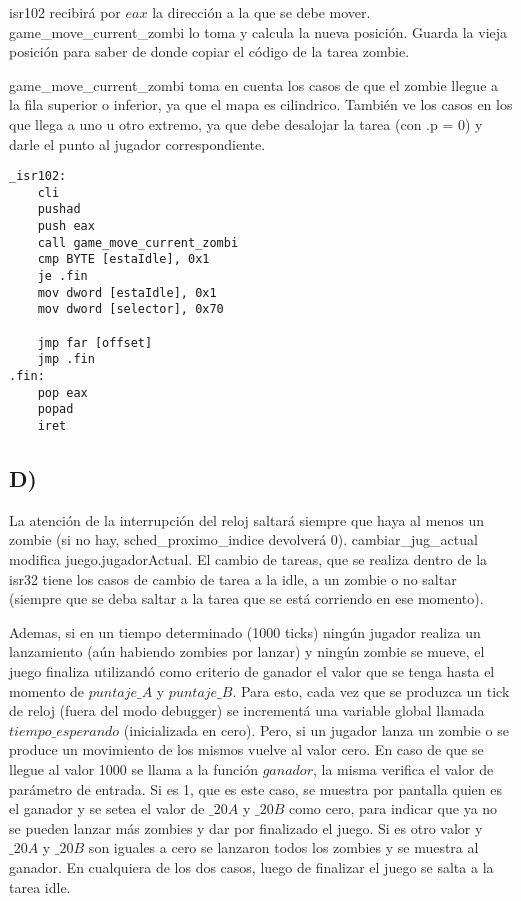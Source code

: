 isr102 recibir\'a por $eax$ la direcci\'on a la que se debe mover. game\_move\_current\_zombi lo toma y calcula la nueva posici\'on. Guarda la 
vieja posici\'on para saber de donde copiar el c\'odigo de la tarea zombie.

game\_move\_current\_zombi toma en cuenta los casos de que el zombie llegue a la fila superior o inferior, ya que el mapa es cilindrico. Tambi\'en 
ve los casos en los que llega a uno u otro extremo, ya que debe desalojar la tarea (con .p = 0) y darle el punto al jugador correspondiente.

\begin{codesnippet}
\begin{verbatim}
_isr102:
	cli
	pushad
	push eax
	call game_move_current_zombi
	cmp BYTE [estaIdle], 0x1
	je .fin
	mov dword [estaIdle], 0x1
	mov dword [selector], 0x70
	
	jmp far [offset]
	jmp .fin
.fin:
	pop eax
	popad
	iret
\end{verbatim}
\end{codesnippet}

\subsection*{D)}
La atenci\'on de la interrupci\'on del reloj saltar\'a siempre que haya al menos un zombie (si no hay, sched_proximo_indice devolver\'a 0). 
cambiar\_jug\_actual modifica 
juego.jugadorActual. El cambio de tareas, que se realiza dentro de la isr32 tiene los casos de cambio de tarea a la idle, a un zombie o no 
saltar (siempre que se deba saltar a la tarea que se est\'a corriendo en ese momento).


Ademas, si en un tiempo determinado (1000 ticks) ning\'un jugador realiza un lanzamiento (a\'un habiendo zombies por lanzar) y 
ning\'un zombie se mueve, el juego finaliza utilizand\'o como criterio de ganador el valor que se tenga hasta el momento de $puntaje\_A$ y 
$puntaje\_B$. Para esto, cada vez que se produzca un tick de reloj (fuera del modo debugger) se 
increment\'a una variable global llamada $tiempo\_esperando$ (inicializada en cero). Pero, si un jugador lanza un zombie o se produce un movimiento de 
los mismos vuelve al 
valor cero. En caso de que se llegue al valor 1000 se llama a la funci\'on $ganador$, la misma verifica el valor de par\'ametro de entrada. Si es 1, 
que es este caso, se 
muestra por pantalla quien es el ganador y se setea el valor de $\_20A$ y $ \_20B$ como cero, para indicar que ya no se pueden lanzar m\'as zombies y 
dar por finalizado el 
juego. Si es otro valor y $\_20A$ y $ \_20B$ son iguales a cero se lanzaron todos los zombies y se muestra al ganador. En cualquiera de los dos 
casos, luego de finalizar el juego se salta a la tarea idle.

